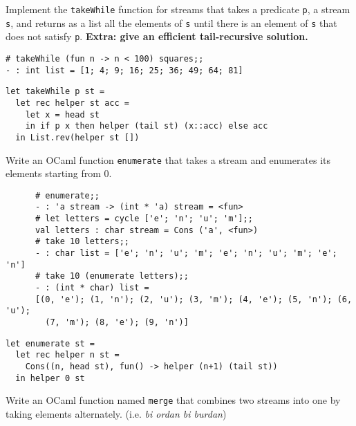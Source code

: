 \documentclass[addpoints]{exam}
\begin{document}
\begin{questions}
  \question
  Implement the \texttt{takeWhile} function
  for streams that
  takes a predicate \texttt{p}, a stream \texttt{s},
  and returns as a list all the elements of \texttt{s} 
  until there is an element of \texttt{s} that does not satisfy \texttt{p}.
  \textbf{Extra: give an efficient tail-recursive solution.}

  {\footnotesize
    \begin{verbatim}
# takeWhile (fun n -> n < 100) squares;;
- : int list = [1; 4; 9; 16; 25; 36; 49; 64; 81]
    \end{verbatim}
  }
  \begin{solutionbox}{3cm}
    {\footnotesize
    \begin{verbatim}
let takeWhile p st =
  let rec helper st acc =
    let x = head st
    in if p x then helper (tail st) (x::acc) else acc
  in List.rev(helper st [])
    \end{verbatim}
    }
  \end{solutionbox}

  \newpage
  \question
  Write an OCaml function \texttt{enumerate} that takes a
  stream and enumerates its elements starting from 0.
  
  {\footnotesize
    \begin{verbatim}
      # enumerate;;
      - : 'a stream -> (int * 'a) stream = <fun>
      # let letters = cycle ['e'; 'n'; 'u'; 'm'];;
      val letters : char stream = Cons ('a', <fun>)
      # take 10 letters;;                         
      - : char list = ['e'; 'n'; 'u'; 'm'; 'e'; 'n'; 'u'; 'm'; 'e'; 'n']
      # take 10 (enumerate letters);;
      - : (int * char) list =
      [(0, 'e'); (1, 'n'); (2, 'u'); (3, 'm'); (4, 'e'); (5, 'n'); (6, 'u');
        (7, 'm'); (8, 'e'); (9, 'n')]
    \end{verbatim}
  }
  \begin{solutionbox}{3cm}
    {\footnotesize
    \begin{verbatim}
let enumerate st =
  let rec helper n st =
    Cons((n, head st), fun() -> helper (n+1) (tail st))
  in helper 0 st
    \end{verbatim}
    }
  \end{solutionbox}

  \question
  Write an OCaml function named \texttt{merge} that combines two streams
  into one by taking elements alternately. (i.e. \emph{bi ordan bi burdan})
  

\end{questions}
\end{document}
